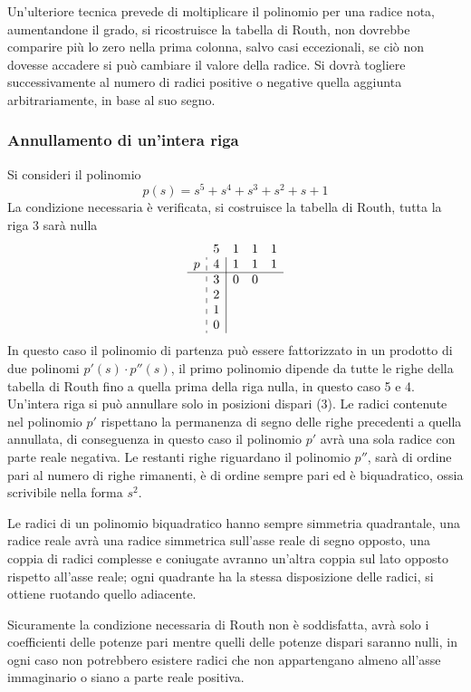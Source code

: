 Un'ulteriore tecnica prevede di moltiplicare il polinomio per una radice nota,
aumentandone il grado, si ricostruisce la tabella di Routh, non dovrebbe
comparire più lo zero nella prima colonna, salvo casi eccezionali, se ciò non
dovesse accadere si può cambiare il valore della radice. Si dovrà togliere
successivamente al numero di radici positive o negative quella aggiunta
arbitrariamente, in base al suo segno.

\subsubsection{Annullamento di un'intera riga}
Si consideri il polinomio
$$
p(s) = s^5 + s^4 + s^3 + s^2 + s + 1
$$
La condizione necessaria è verificata, si costruisce la tabella di Routh, tutta
la riga 3 sarà nulla
$$
\begin{array}{c:c|ccc}
  & 5 & 1 & 1 & 1 \\
p & 4 & 1 & 1 & 1 \\ \hline
  & 3 & 0 & 0 \\
  & 2 \\
  & 1 \\
  & 0
\end{array}
$$
In questo caso il polinomio di partenza può essere fattorizzato in un prodotto
di due polinomi $p'(s) \cdot p''(s)$, il primo polinomio dipende da tutte le
righe della tabella di Routh fino a quella prima della riga nulla, in questo
caso 5 e 4. Un'intera riga si può annullare solo in posizioni dispari (3).
Le radici contenute nel polinomio $p'$ rispettano la permanenza di segno delle
righe precedenti a quella annullata, di conseguenza in questo caso il polinomio
$p'$ avrà una sola radice con parte reale negativa.
Le restanti righe riguardano il polinomio $p''$, sarà di ordine pari al numero
di righe rimanenti, è di ordine sempre pari ed è biquadratico, ossia scrivibile
nella forma $s^2$.

Le radici di un polinomio biquadratico hanno sempre simmetria quadrantale, una
radice reale avrà una radice simmetrica sull'asse reale di segno opposto, una
coppia di radici complesse e coniugate avranno un'altra coppia sul lato opposto
rispetto all'asse reale; ogni quadrante ha la stessa disposizione delle
radici, si ottiene ruotando quello adiacente.

Sicuramente la condizione necessaria di Routh non è soddisfatta, avrà solo i
coefficienti delle potenze pari mentre quelli delle potenze dispari saranno
nulli, in ogni caso non potrebbero esistere radici che non appartengano almeno
all'asse immaginario o siano a parte reale positiva.

